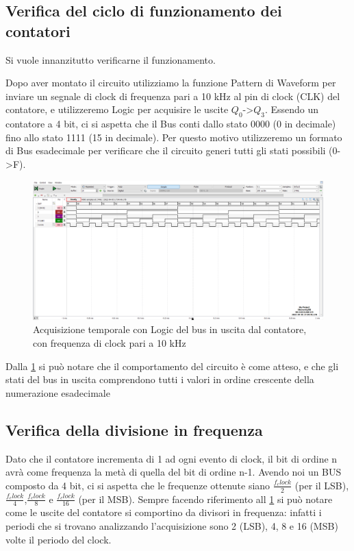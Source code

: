 \documentclass[10pt, a4paper, italian]{article}
\begin{document}
\subsection{Verifica del ciclo di funzionamento dei contatori}
Si vuole innanzitutto verificarne il funzionamento.

Dopo aver montato il circuito utilizziamo la funzione Pattern di Waveform per inviare un segnale di clock di frequenza pari a 10 kHz al pin di clock (CLK) del contatore, e utilizzeremo Logic per acquisire le uscite $Q_0$->$Q_3$.
Essendo un contatore a 4 bit, ci si aspetta che il Bus conti dallo stato 0000 (0 in decimale) fino allo stato 1111 (15 in decimale).
Per questo motivo utilizzeremo un formato di Bus esadecimale per verificare che il circuito generi tutti gli stati possibili (0->F).
\begin{figure}[htbp]
\centering
	\includegraphics[width=\textwidth]{5.b}
	\caption{Acquisizione temporale con Logic del bus in uscita dal contatore, con frequenza di clock pari a 10 kHz \label{fig: Count_Clock}}
\end{figure}
Dalla \cref{fig: Count_Clock} si può notare che il comportamento del circuito è come atteso, e che gli stati del bus in uscita comprendono tutti i valori in ordine crescente della numerazione esadecimale 
\subsection{Verifica della divisione in frequenza}

Dato che il contatore incrementa di 1 ad ogni evento di clock, il bit di ordine n avrà come frequenza la metà di quella del bit di ordine n-1.
Avendo noi un BUS composto da 4 bit, ci si aspetta che le frequenze ottenute siano $\frac{f_clock}{2}$ (per il LSB),$\frac{f_clock}{4}$,$\frac{f_clock}{8}$ e $\frac{f_clock}{16}$ (per il MSB).
Sempre facendo riferimento all  \cref{fig: Count_Clock} si può notare come le uscite del contatore si comportino da divisori in frequenza: infatti i periodi che si trovano analizzando l'acquisizione sono 2 (LSB), 4, 8 e 16 (MSB) volte il periodo del clock.
\end{document}
